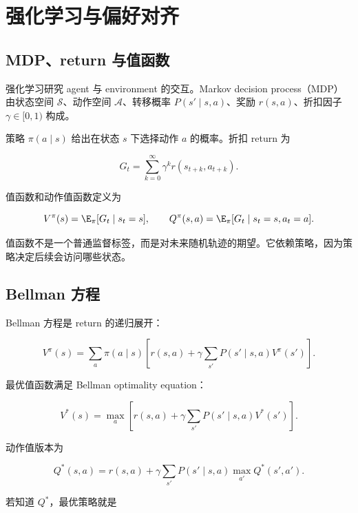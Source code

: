\section{强化学习与偏好对齐}


\subsection{MDP、return 与值函数}


强化学习研究 agent 与 environment 的交互。Markov decision process（MDP）由状态空间 \(\mathcal{S}\)、动作空间 \(\mathcal{A}\)、转移概率 \(P(s'\mid s,a)\)、奖励 \(r(s,a)\)、折扣因子 \(\gamma\in[0,1)\) 构成。

策略 \(\pi(a\mid s)\) 给出在状态 \(s\) 下选择动作 \(a\) 的概率。折扣 return 为

\[
  G_t=\sum_{k=0}^{\infty}\gamma^k r(s_{t+k},a_{t+k}).
\]

值函数和动作值函数定义为

\[
  V^\pi(s)=\E_\pi[G_t\mid s_t=s],
  \qquad
  Q^\pi(s,a)=\E_\pi[G_t\mid s_t=s,a_t=a].
\]

值函数不是一个普通监督标签，而是对未来随机轨迹的期望。它依赖策略，因为策略决定后续会访问哪些状态。

\subsection{Bellman 方程}


Bellman 方程是 return 的递归展开：

\[
  V^\pi(s)
  =
  \sum_a\pi(a\mid s)
  \left[
    r(s,a)
    +
    \gamma
    \sum_{s'}P(s'\mid s,a)V^\pi(s')
  \right].
\]

最优值函数满足 Bellman optimality equation：

\[
  V^*(s)
  =
  \max_{a}
  \left[
    r(s,a)
    +
    \gamma
    \sum_{s'}P(s'\mid s,a)V^*(s')
  \right].
\]

动作值版本为

\[
  Q^*(s,a)
  =
  r(s,a)
  +
  \gamma
  \sum_{s'}P(s'\mid s,a)
  \max_{a'}Q^*(s',a').
\]

若知道 \(Q^*\)，最优策略就是


